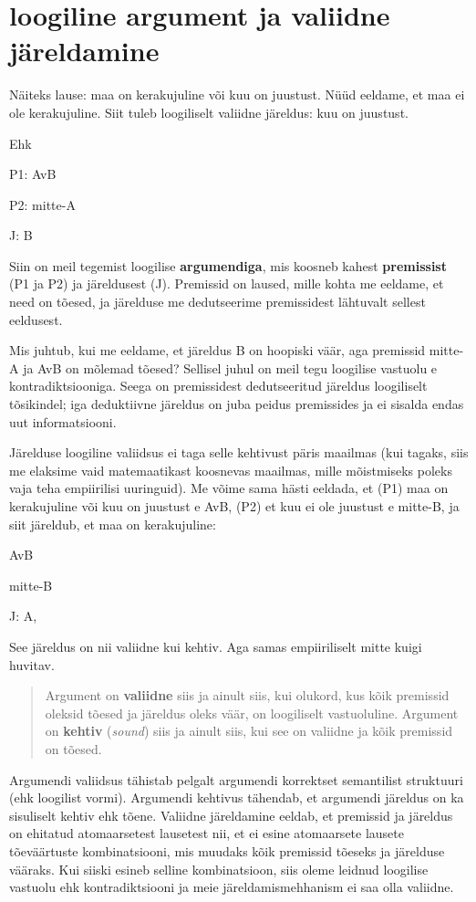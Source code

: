 \documentclass[]{book}
\begin{document}
\hypertarget{loogiline-argument-ja-valiidne-jareldamine}{%
\section{loogiline argument ja valiidne järeldamine}\label{loogiline-argument-ja-valiidne-jareldamine}}

Näiteks lause: maa on kerakujuline või kuu on juustust. Nüüd eeldame, et maa ei ole kerakujuline. Siit tuleb loogiliselt valiidne järeldus: kuu on juustust.

Ehk

P1: AvB

P2: mitte-A

J: B

Siin on meil tegemist loogilise \textbf{argumendiga}, mis koosneb kahest \textbf{premissist} (P1 ja P2) ja järeldusest (J). Premissid on laused, mille kohta me eeldame, et need on tõesed, ja järelduse me dedutseerime premissidest lähtuvalt sellest eeldusest.

Mis juhtub, kui me eeldame, et järeldus B on hoopiski väär, aga premissid mitte-A ja AvB on mõlemad tõesed? Sellisel juhul on meil tegu loogilise vastuolu e kontradiktsiooniga. Seega on premissidest dedutseeritud järeldus loogiliselt tõsikindel; iga deduktiivne järeldus on juba peidus premissides ja ei sisalda endas uut informatsiooni.

Järelduse loogiline valiidsus ei taga selle kehtivust päris maailmas (kui tagaks, siis me elaksime vaid matemaatikast koosnevas maailmas, mille mõistmiseks poleks vaja teha empiirilisi uuringuid). Me võime sama hästi eeldada, et (P1) maa on kerakujuline või kuu on juustust e AvB, (P2) et kuu ei ole juustust e mitte-B, ja siit järeldub, et maa on kerakujuline:

AvB

mitte-B

J: A,

See järeldus on nii valiidne kui kehtiv. Aga samas empiiriliselt mitte kuigi huvitav.

\begin{quote}
Argument on \textbf{valiidne} siis ja ainult siis, kui olukord, kus kõik premissid oleksid tõesed ja järeldus oleks väär, on loogiliselt vastuoluline. Argument on \textbf{kehtiv} (\emph{sound}) siis ja ainult siis, kui see on valiidne ja kõik premissid on tõesed.
\end{quote}

Argumendi valiidsus tähistab pelgalt argumendi korrektset semantilist struktuuri (ehk loogilist vormi). Argumendi kehtivus tähendab, et argumendi järeldus on ka sisuliselt kehtiv ehk tõene. Valiidne järeldamine eeldab, et premissid ja järeldus on ehitatud atomaarsetest lausetest nii, et ei esine atomaarsete lausete tõeväärtuste kombinatsiooni, mis muudaks kõik premissid tõeseks ja järelduse vääraks. Kui siiski esineb selline kombinatsioon, siis oleme leidnud loogilise vastuolu ehk kontradiktsiooni ja meie järeldamismehhanism ei saa olla valiidne.
\end{document}
